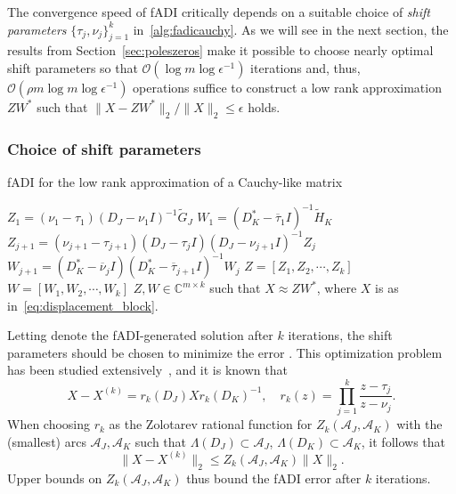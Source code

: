 \documentclass[final,reqno,onefignum,onetabnum]{siamart190516}
\begin{document}
The convergence speed of fADI critically depends on a suitable choice of \textit{shift parameters} $\{\tau_{j}, \nu_{j}\}_{j = 1}^k$ in~\cref{alg:fadicauchy}. As we will see in the next section, the results from Section~\ref{sec:poleszeros} make it possible to choose nearly optimal shift parameters so that 
$\mathcal{O}( \log m \log \epsilon^{-1} )$ iterations and, thus, $\mathcal{O}( \rho m \log m \log \epsilon^{-1} )$ operations suffice to construct a low rank approximation $ZW^*$ such that \hbox{$\|X - ZW^*\|_2/\|X\|_2 \leq \epsilon$} holds.


\subsubsection{Choice of shift parameters}
\begin{algorithm}[t!]
  \caption{fADI for the low rank approximation of a Cauchy-like matrix} \label{alg:fadicauchy}
  \begin{algorithmic}[1]
\State $Z_1 = (\nu_1-\tau_1) (D_J - \nu_1 I)^{-1}\widetilde{G}_J$
\State$W_1 = (D_K^*-\overline{\tau}_1 I)^{-1}\widetilde{H}_K$
	\State $Z_{j +1} = (\nu_{j+1}-\tau_{j+1}) (D_J - \tau_jI) (D_J-\nu_{j+1} I)^{-1} Z_j$
	\State $W_{j+1} = (D_K^* - \overline{\nu}_j I) (D_{K}^* - \overline{\tau}_{j+1} I)^{-1} W_j$
    \EndFor
\State $Z = \left[ Z_1, Z_2, \cdots, Z_k \right]$
\State $W = \left[ W_1, W_2, \cdots, W_k \right]$
   \EndProcedure
{} $Z,W \in \mathbb{C}^{m \times k}$ such that $X \approx ZW^*$, where $X$ is as in~\eqref{eq:displacement_block}. 
 \end{algorithmic}
\end{algorithm}
Letting  denote the fADI-generated solution after $k$ iterations, the shift parameters should be chosen to minimize the error . This optimization problem has been studied extensively~\cite{Beckermann2019, lebedev1977zolotarev, lu1991solution, sabino2007solution}, and it is known that 
\begin{equation} 
\label{eq:ADIerror}
X - X^{(k)} = r_k(D_J) X r_k(D_K)^{-1},  \quad r_k(z) = \prod_{j = 1}^k \dfrac{z - \tau_j}{z-\nu_j}.
\end{equation} 
When choosing $r_k$ as the Zolotarev rational function for 
$Z_k(\mathcal{A}_J, \mathcal{A}_K)$ with the (smallest) arcs $\mathcal{A}_J, \mathcal{A}_K$ such that
$\Lambda(D_J) \subset \mathcal A_J $, $\Lambda(D_K) \subset \mathcal A_K$, it follows that
\begin{equation} \label{eq:bnd_errfadi}
\|X-X^{(k)}\|_2 \leq Z_k(\mathcal{A}_J, \mathcal{A}_K) \|X\|_2.
\end{equation}
Upper bounds on $Z_k(\mathcal{A}_J, \mathcal{A}_K)$ thus bound the fADI error after $k$ iterations. 
\end{document}
